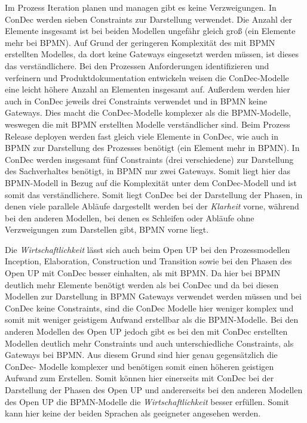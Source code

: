 Im Prozess Iteration planen und managen gibt es keine Verzweigungen. In ConDec werden sieben Constraints zur Darstellung verwendet. Die Anzahl der Elemente insgesamt ist bei beiden Modellen ungefähr gleich groß (ein Elemente mehr bei BPMN). Auf Grund der geringeren Komplexität des mit BPMN erstellten Modelles, da dort keine Gateways eingesetzt werden müssen, ist dieses das verständlichere.\newline
Bei den Prozessen Anforderungen identifizieren und verfeinern und Produktdokumentation entwickeln weisen die ConDec-Modelle eine leicht höhere Anzahl an Elementen insgesamt auf. Außerdem werden hier auch in ConDec jeweils drei Constraints verwendet und in BPMN keine Gateways. Dies macht die ConDec-Modelle komplexer als die BPMN-Modelle, weswegen die mit BPMN erstellten Modelle verständlicher sind.\newline
Beim Prozess Release deployen werden fast gleich viele Elemente in ConDec, wie auch in BPMN zur Darstellung des Prozesses benötigt (ein Element mehr in BPMN). In ConDec werden insgesamt fünf Constraints (drei verschiedene) zur Darstellung des Sachverhaltes benötigt, in BPMN nur zwei Gateways. Somit liegt hier das BPMN-Modell in Bezug auf die Komplexität unter dem ConDec-Modell und ist somit das verständlichere.\newline
Somit liegt ConDec bei der Darstellung der Phasen, in denen viele parallele Abläufe dargestellt werden bei der \textit{Klarheit} vorne, während bei den anderen Modellen, bei denen es Schleifen oder Abläufe ohne Verzweigungen zum Darstellen gibt, BPMN vorne liegt.\newline

Die \textit{Wirtschaftlichkeit} lässt sich auch beim Open UP bei den Prozessmodellen Inception, Elaboration, Construction und Transition sowie bei den Phasen des Open UP mit ConDec besser einhalten, als mit BPMN. Da hier bei BPMN deutlich mehr Elemente benötigt werden als bei ConDec und da bei diesen Modellen zur Darstellung in BPMN Gateways verwendet werden müssen und bei ConDec keine Constraints, sind die ConDec Modelle hier weniger komplex und somit mit weniger geistigem Aufwand erstellbar als die BPMN-Modelle.  \newline
Bei den anderen Modellen des Open UP jedoch gibt es bei den mit ConDec erstellten Modellen deutlich mehr Constraints und auch unterschiedliche Constraints, als  Gateways bei BPMN. Aus diesem Grund sind hier genau gegensätzlich die ConDec- Modelle komplexer und benötigen somit einen höheren geistigen Aufwand zum Erstellen. \newline
Somit können hier einerseits mit ConDec bei der Darstellung der Phasen des Open UP und andererseits bei den anderen Modellen des Open UP die BPMN-Modelle die \textit{Wirtschaftlichkeit} besser erfüllen. Somit kann hier keine der beiden Sprachen als geeigneter angesehen werden.\newline


